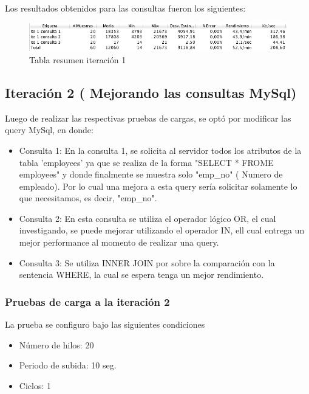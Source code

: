 Los resultados obtenidos para las consultas fueron los siguientes:

 \begin{figure}[htb]
 	\label{Figura_8}
 	\begin{center}
 		\includegraphics[scale=0.6]{imagenes/ite1.png}
 		\caption{Tabla resumen iteración 1}
 	\end{center}
 \end{figure}
 
\subsection{Iteración 2 ( Mejorando las consultas MySql)} 

Luego de realizar las respectivas pruebas de cargas, se optó por modificar las query MySql, en donde: 


\begin{itemize}
	\item Consulta 1: En la consulta 1, se solicita al servidor todos los atributos de la tabla 'employees' ya que se realiza de la forma "SELECT * FROME employees" y donde finalmente se muestra solo "emp\_no" ( Numero de empleado). Por lo cual una mejora a esta query sería solicitar solamente lo que necesitamos, es decir, "emp\_no".\\
	
	\item Consulta 2: En esta consulta se utiliza el operador lógico OR, el cual investigando, se puede mejorar utilizando el operador IN, ell cual entrega un mejor performance al momento de realizar una query.\\
	
	\item Consulta 3: Se utiliza INNER JOIN por sobre la comparación con la sentencia WHERE, la cual se espera tenga un mejor rendimiento.
\end{itemize}

\subsubsection{Pruebas de carga a la iteración 2}

La prueba se configuro bajo las siguientes condiciones

\begin{itemize}
	\item Número de hilos: 20
	\item Periodo de subida: 10 seg.
	\item Ciclos: 1
\end{itemize}

